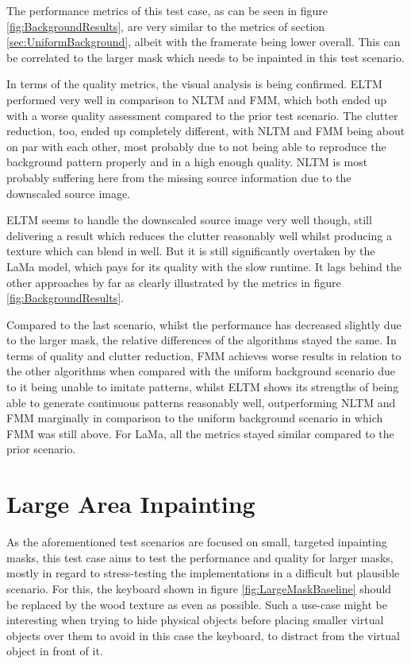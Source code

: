 The performance metrics of this test case, as can be seen in figure \ref{fig:BackgroundResults}, are very similar to the metrics of section \ref{sec:UniformBackground}, albeit with the framerate being lower overall. This can be correlated to the larger mask which needs to be inpainted in this test scenario.

In terms of the quality metrics, the visual analysis is being confirmed. ELTM performed very well in comparison to NLTM and FMM, which both ended up with a worse quality assessment compared to the prior test scenario. The clutter reduction, too, ended up completely different, with NLTM and FMM being about on par with each other, most probably due to not being able to reproduce the background pattern properly and in a high enough quality.
NLTM is most probably suffering here from the missing source information due to the downscaled source image.

ELTM seems to handle the downscaled source image very well though, still delivering a result which reduces the clutter reasonably well whilst producing a texture which can blend in well. But it is still significantly overtaken by the LaMa model, which pays for its quality with the slow runtime. It lags behind the other approaches by far as clearly illustrated by the metrics in figure \ref{fig:BackgroundResults}.

Compared to the last scenario, whilst the performance has decreased slightly due to the larger mask, the relative differences of the algorithms stayed the same. In terms of quality and clutter reduction, FMM achieves worse results in relation to the other algorithms when compared with the uniform background scenario due to it being unable to imitate patterns, whilst ELTM shows its strengths of being able to generate continuous patterns reasonably well, outperforming NLTM and FMM marginally in comparison to the uniform background scenario in which FMM was still above. For LaMa, all the metrics stayed similar compared to the prior scenario.

\section{Large Area Inpainting}
\label{sec:LaIpEval}

As the aforementioned test scenarios are focused on small, targeted inpainting masks, this test case aims to test the performance and quality for larger masks, mostly in regard to stress-testing the implementations in a difficult but plausible scenario. For this, the keyboard shown in figure \ref{fig:LargeMaskBaseline} should be replaced by the wood texture as even as possible. Such a use-case might be interesting when trying to hide physical objects before placing smaller virtual objects over them to avoid in this case the keyboard, to distract from the virtual object in front of it.  

